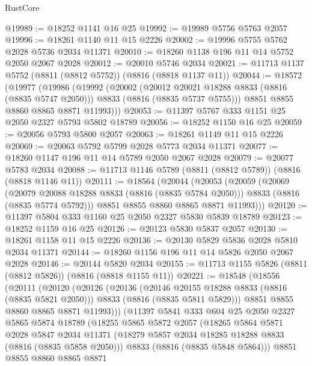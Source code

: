 \begin{lexlean}{RustCore}
\begin{coremodule}
@19989 := @18252 @1141 @16 @25
@19992 := @19989 @5756 @5763 @2057
@19996 := @18261 @1140 @11 @15 @2226
@20002 := @19996 @5755 @5762 @2028 @5736 @2034 @11371
@20010 := @18260 @1138 @196 @11 @14 @5752 @2050 @2067 @2028
@20012 := @20010 @5746 @2034
@20021 := @11713 @1137 @5752 (@8811 (@8812 @5752)) (@8816 (@8818 @1137 @11))
@20044 := @18572
    (@19977
      (@19986
        (@19992
          (@20002
            (@20012 @20021 @18288 @8833 (@8816 (@8835 @5747 @2050)))
            @8833
            (@8816 (@8835 @5737 @5755)))
          @8851
          @8855
          @8860
          @8865
          @8871
          @11993)))
@20053 := @11397 @5767 @333 @1151 @25 @2050 @2327 @5793 @5802 @18789
@20056 := @18252 @1150 @16 @25
@20059 := @20056 @5793 @5800 @2057
@20063 := @18261 @1149 @11 @15 @2226
@20069 := @20063 @5792 @5799 @2028 @5773 @2034 @11371
@20077 := @18260 @1147 @196 @11 @14 @5789 @2050 @2067 @2028
@20079 := @20077 @5783 @2034
@20088 := @11713 @1146 @5789 (@8811 (@8812 @5789)) (@8816 (@8818 @1146 @11))
@20111 := @18564
    (@20044
      (@20053
        (@20059
          (@20069
            (@20079 @20088 @18288 @8833 (@8816 (@8835 @5784 @2050)))
            @8833
            (@8816 (@8835 @5774 @5792)))
          @8851
          @8855
          @8860
          @8865
          @8871
          @11993)))
@20120 := @11397 @5804 @333 @1160 @25 @2050 @2327 @5830 @5839 @18789
@20123 := @18252 @1159 @16 @25
@20126 := @20123 @5830 @5837 @2057
@20130 := @18261 @1158 @11 @15 @2226
@20136 := @20130 @5829 @5836 @2028 @5810 @2034 @11371
@20144 := @18260 @1156 @196 @11 @14 @5826 @2050 @2067 @2028
@20146 := @20144 @5820 @2034
@20155 := @11713 @1155 @5826 (@8811 (@8812 @5826)) (@8816 (@8818 @1155 @11))
@20221 := @18548
    (@18556
      (@20111
        (@20120
          (@20126
            (@20136
              (@20146 @20155 @18288 @8833 (@8816 (@8835 @5821 @2050)))
              @8833
              (@8816 (@8835 @5811 @5829)))
            @8851
            @8855
            @8860
            @8865
            @8871
            @11993)))
      (@11397
        @5841
        @333
        @604
        @25
        @2050
        @2327
        @5865
        @5874
        @18789
        (@18255
          @5865
          @5872
          @2057
          (@18265
            @5864
            @5871
            @2028
            @5847
            @2034
            @11371
            (@18279 @5857 @2034 @18285 @18288 @8833 (@8816 (@8835 @5858 @2050)))
            @8833
            (@8816 (@8835 @5848 @5864)))
          @8851
          @8855
          @8860
          @8865
          @8871

\end{coremodule}
\end{lexlean}
